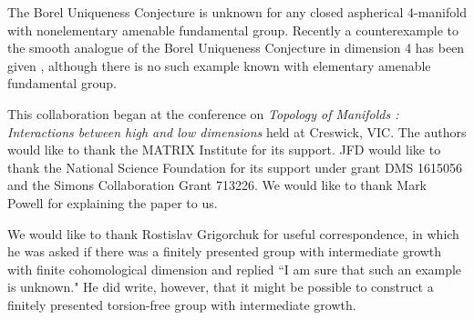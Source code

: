 \documentclass[12pt]{amsart}
\theoremstyle{definition}
\begin{document}
The Borel Uniqueness Conjecture is unknown for any closed aspherical 4-manifold with nonelementary amenable fundamental group.   Recently a counterexample to the smooth analogue of the Borel Uniqueness Conjecture in dimension 4 has been given \cite{DHHRS}, although there is no such example known with elementary amenable fundamental group.

\medskip
{}
This collaboration began at the conference on
 {\it Topology of Manifolds : Interactions between high and low dimensions\/} 
 held at Creswick, VIC.
The authors would like to thank the 
 MATRIX Institute for its support.  
 JFD would like to thank the National Science Foundation for its support under grant DMS 1615056 and the Simons Collaboration Grant 713226.   We would like to thank Mark Powell for explaining the paper \cite{CP} to us.
 
 We would like to thank  Rostislav Grigorchuk for useful correspondence, in which he was asked if  there was a finitely presented group with intermediate growth with finite cohomological dimension  and replied ``I am sure that such an example is unknown."  He did write, however, that it might be possible to construct a finitely presented torsion-free group with intermediate growth.
 
 {}

\end{document}
